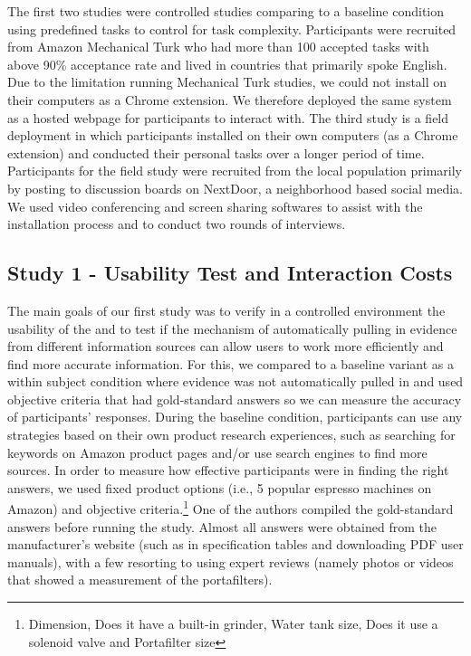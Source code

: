 The first two studies were controlled studies comparing \SYSTEM to a baseline condition using predefined tasks to control for task complexity. Participants were recruited from Amazon Mechanical Turk who had more than 100 accepted tasks with above 90\% acceptance rate and lived in countries that primarily spoke English. Due to the limitation running Mechanical Turk studies, we could not install \SYSTEM on their computers as a Chrome extension. We therefore deployed the same system as a hosted webpage for participants to interact with. The third study is a field deployment in which participants installed \SYSTEM on their own computers (as a Chrome extension) and conducted their personal tasks over a longer period of time. Participants for the field study were recruited from the local population primarily by posting to discussion boards on NextDoor, a neighborhood based social media. We used video conferencing and screen sharing softwares to assist with the installation process and to conduct two rounds of interviews.

\subsection{Study 1 - Usability Test and Interaction Costs}


The main goals of our first study was to verify in a controlled environment the usability of the \SYSTEM and to test if the mechanism of automatically pulling in evidence from different information sources can allow users to work more efficiently and find more accurate information. For this, we compared \SYSTEM to a baseline variant as a within subject condition where evidence was not automatically pulled in and used objective criteria that had gold-standard answers so we can measure the accuracy of participants’ responses. During the baseline condition, participants can use any strategies based on their own product research experiences, such as searching for keywords on Amazon product pages and/or use search engines to find more sources. In order to measure how effective participants were in finding the right answers, we used fixed product options (i.e., 5 popular espresso machines on Amazon) and objective criteria.\footnote{Dimension, Does it have a built-in grinder, Water tank size, Does it use a solenoid valve and Portafilter size} One of the authors compiled the gold-standard answers before running the study. Almost all answers were obtained from the manufacturer’s website (such as in specification tables and downloading PDF user manuals), with a few resorting to using expert reviews (namely photos or videos that showed a measurement of the portafilters).

